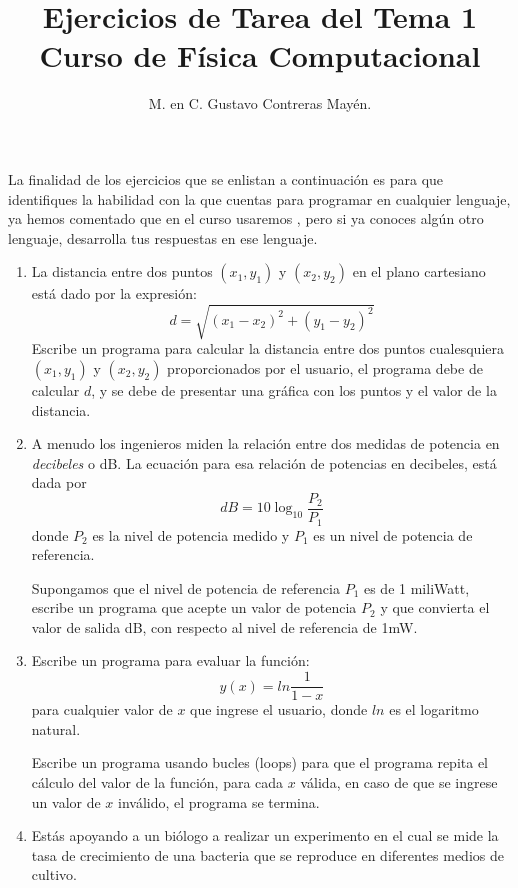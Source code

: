 
\author{M. en C. Gustavo Contreras Mayén.}
\title{Ejercicios de Tarea del Tema 1 \\ Curso de Física Computacional}
\date{ }

\maketitle
\fontsize{14}{14}\selectfont
La finalidad de los ejercicios que se enlistan a continuación es para que identifiques la habilidad con la que cuentas para programar en cualquier lenguaje, ya hemos comentado que en el curso usaremos \python, pero si ya conoces algún otro lenguaje, desarrolla tus respuestas en ese lenguaje.
\begin{enumerate}
\item La distancia entre dos puntos $(x_{1},y_{1})$ y $(x_{2},y_{2})$ en el plano cartesiano está dado por la expresión:
\[ d = \sqrt{(x_{1} - x_{2})^{2} + (y_{1} - y_{2})^{2}} \]
Escribe un programa para calcular la distancia entre dos puntos cualesquiera $(x_{1}, y_{1})$ y $(x_{2}, y_{2})$ proporcionados por el usuario, el programa debe de calcular $d$, y se debe de presentar una gráfica con los puntos y el valor de la distancia.
\item A menudo los ingenieros miden la relación entre dos medidas de potencia en \textit{decibeles} o dB. La ecuación para esa relación de potencias en decibeles, está dada por
\[ dB = 10 \log_{10} \dfrac{P_{2}}{P_{1}} \]
donde $P_{2}$ es la nivel de potencia medido y $P_{1}$ es un nivel de potencia de referencia.
\par
Supongamos que el nivel de potencia de referencia $P_{1}$ es de 1 miliWatt, escribe un programa que acepte un valor de potencia $P_{2}$ y que convierta el valor de salida dB, con respecto al nivel de referencia de 1mW.
\item Escribe un programa para evaluar la función:
\[ y(x) = ln \dfrac{1}{1-x} \]
para cualquier valor de $x$ que ingrese el usuario, donde $ln$ es el logaritmo natural.
\par
Escribe un programa usando bucles (loops) para que el programa repita el cálculo del valor de la función, para cada $x$ válida, en caso de que se ingrese un valor de $x$ inválido, el programa se termina.
\item Estás apoyando a un biólogo a realizar un experimento en el cual se mide la tasa de crecimiento de una bacteria que se reproduce en diferentes medios de cultivo.
\par

\end{enumerate}
